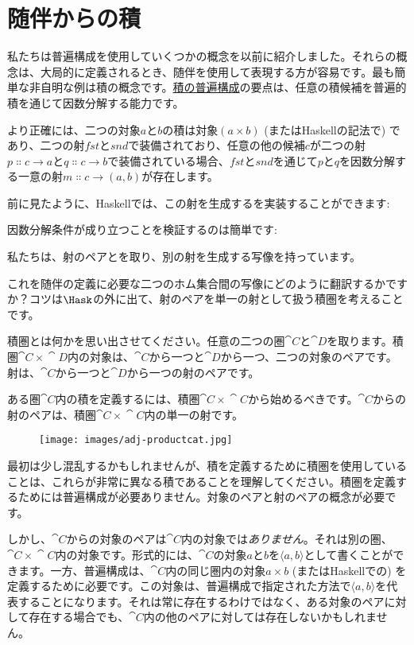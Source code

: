 \section{随伴からの積}

私たちは普遍構成を使用していくつかの概念を以前に紹介しました。それらの概念は、大局的に定義されるとき、随伴を使用して表現する方が容易です。最も簡単な非自明な例は積の概念です。\hyperref[products-and-coproducts]{積の普遍構成}の要点は、任意の積候補を普遍的積を通じて因数分解する能力です。

より正確には、二つの対象$a$と$b$の積は対象$(a\times{}b)$ (またはHaskellの記法で) であり、二つの射$\mathit{fst}$と$\mathit{snd}$で装備されており、任意の他の候補$c$が二つの射
$p \Colon c \to a$と$q \Colon c \to b$で装備されている場合、$\mathit{fst}$と$\mathit{snd}$を通じて$p$と$q$を因数分解する一意の射$m \Colon c \to (a, b)$が存在します。

前に見たように、Haskellでは、この射を生成するを実装することができます: 

因数分解条件が成り立つことを検証するのは簡単です: 

私たちは、射のペアとを取り、別の射を生成する写像を持っています。

これを随伴の定義に必要な二つのホム集合間の写像にどのように翻訳するかですか？コツは$\Hask$の外に出て、射のペアを単一の射として扱う積圏を考えることです。

積圏とは何かを思い出させてください。任意の二つの圏$\cat{C}$と$\cat{D}$を取ります。積圏$\cat{C}\times{}\cat{D}$内の対象は、$\cat{C}$から一つと$\cat{D}$から一つ、二つの対象のペアです。射は、$\cat{C}$から一つと$\cat{D}$から一つの射のペアです。

ある圏$\cat{C}$内の積を定義するには、積圏$\cat{C}\times{}\cat{C}$から始めるべきです。$\cat{C}$からの射のペアは、積圏$\cat{C}\times{}\cat{C}$内の単一の射です。

\begin{figure}[H]
  \centering
  \texttt{[image: images/adj-productcat.jpg]}
\end{figure}

\noindent
最初は少し混乱するかもしれませんが、積を定義するために積圏を使用していることは、これらが非常に異なる積であることを理解してください。積圏を定義するためには普遍構成が必要ありません。対象のペアと射のペアの概念が必要です。

しかし、$\cat{C}$からの対象のペアは$\cat{C}$内の対象では\emph{ありません}。それは別の圏、$\cat{C}\times{}\cat{C}$内の対象です。形式的には、$\cat{C}$の対象$a$と$b$を$\langle a, b \rangle$として書くことができます。一方、普遍構成は、$\cat{C}$内の同じ圏内の対象$a\times{}b$ (またはHaskellでの) を定義するために必要です。この対象は、普遍構成で指定された方法で$\langle a, b \rangle$を代表することになります。それは常に存在するわけではなく、ある対象のペアに対して存在する場合でも、$\cat{C}$内の他のペアに対しては存在しないかもしれません。

